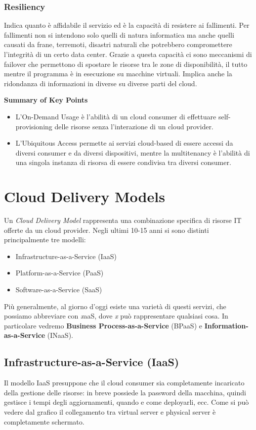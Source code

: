 \subsubsection{Resiliency}
Indica quanto è affidabile il servizio ed è la capacità di resistere ai fallimenti. Per fallimenti non si intendono solo quelli di natura informatica ma anche quelli causati da frane, terremoti, disastri naturali che potrebbero compromettere l'integrità di un certo data center. Grazie a questa capacità ci sono meccanismi di failover che permettono di spostare le risorse tra le zone di disponibilità, il tutto mentre il programma è in esecuzione su macchine virtuali. Implica anche la ridondanza di informazioni in diverse su diverse parti del cloud.


\begin{mdframed}[backgroundcolor=gray!20,shadow=false]
\textbf{Summary of Key Points}
\begin{itemize}
    \item L'On-Demand Usage è l'abilità di un cloud consumer di effettuare self-provisioning delle risorse senza l'interazione di un cloud provider.
    \item L'Ubiquitous Access permette ai servizi cloud-based di essere accessi da diversi consumer e da diversi dispositivi, mentre la multitenancy è l'abilità di una singola instanza di risorsa di essere condivisa tra diversi consumer.
\end{itemize}
\end{mdframed}

\section{Cloud Delivery Models}
Un \textit{Cloud Delivery Model} rappresenta una combinazione specifica di risorse IT offerte da un cloud provider. Negli ultimi 10-15 anni si sono distinti principalmente tre modelli:
\begin{itemize}
    \item Infrastructure-as-a-Service (IaaS)
    \item Platform-as-a-Service (PaaS)
    \item Software-as-a-Service (SaaS)
\end{itemize}
Più generalmente, al giorno d'oggi esiste una varietà di questi servizi, che possiamo abbreviare con \textit{x}aaS, dove \textit{x} può rappresentare qualsiasi cosa. In particolare vedremo \textbf{Business Process-as-a-Service} (BPaaS) e \textbf{Information-as-a-Service} (INaaS). 
\subsection{Infrastructure-as-a-Service (IaaS)}
Il modello IaaS presuppone che il cloud consumer sia completamente incaricato della gestione delle risorse: in breve possiede la password della macchina, quindi gestisce i tempi degli aggiornamenti, quando e come deployarli, ecc. \newline
Come si può vedere dal grafico il collegamento tra virtual server e physical server è completamente schermato.

